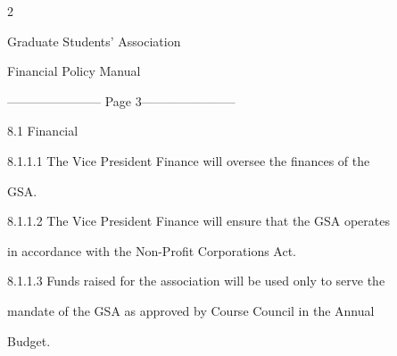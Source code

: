   

  

  

  

  

  

  

  

  

  

  

  

  

  

  

  

  

  

  

  

  



                                                                          2  

                                                

                                                

                                              Graduate Students’ Association  

                                                   Financial Policy Manual  

  


----------------------- Page 3-----------------------

                                  8.1     Financial   



  



  8.1.1.1   The  Vice  President  Finance  will  oversee  the  finances  of  the  

    GSA.   



  8.1.1.2   The Vice President Finance will ensure that the GSA operates  

    in accordance with the Non-Profit Corporations Act.   



  8.1.1.3   Funds raised for the association will be used  only to serve the  

    mandate  of  the  GSA  as  approved  by  Course  Council  in  the  Annual  

    Budget.   



